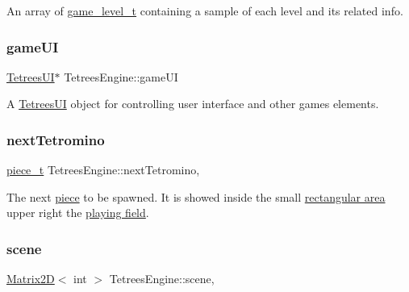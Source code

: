 An array of \hyperlink{structgame__level__t}{game\+\_\+level\+\_\+t} containing a sample of each level and its related info. \mbox{\label{classTetreesEngine_a01bf1d438236d5f57129ffb22adf59ce}} 
\subsubsection{\texorpdfstring{game\+UI}{gameUI}}
{\footnotesize\ttfamily \hyperlink{classTetreesUI}{Tetrees\+UI}$\ast$ Tetrees\+Engine\+::game\+UI\hspace{0.3cm}{\ttfamily [private]}}

A \hyperlink{classTetreesUI}{Tetrees\+UI} object for controlling user interface and other game\textquotesingle{}s elements. \mbox{\label{classTetreesEngine_a44c902481f5d8a72ca8a78d24f5c3a33}} 
\subsubsection{\texorpdfstring{next\+Tetromino}{nextTetromino}}
{\footnotesize\ttfamily \hyperlink{structpiece__t}{piece\+\_\+t} Tetrees\+Engine\+::next\+Tetromino\hspace{0.3cm}{\ttfamily [static]}, {\ttfamily [private]}}

The next \hyperlink{structpiece__t}{piece} to be spawned. It is showed inside the small \hyperlink{TetreesUI_8cpp_aac997784ac88b494498d6e08d6fe62d5}{rectangular area} upper right the \hyperlink{TetreesUI_8cpp_af900bffe25b932fb86dc61cfdf839e95}{playing field}. \mbox{\label{classTetreesEngine_aeade477c0bc2eaaa894ebbdaca93584e}} 
\subsubsection{\texorpdfstring{scene}{scene}}
{\footnotesize\ttfamily \hyperlink{classMatrix2D}{Matrix2D}$<$ int $>$ Tetrees\+Engine\+::scene\hspace{0.3cm}{\ttfamily [static]}, {\ttfamily [private]}}


